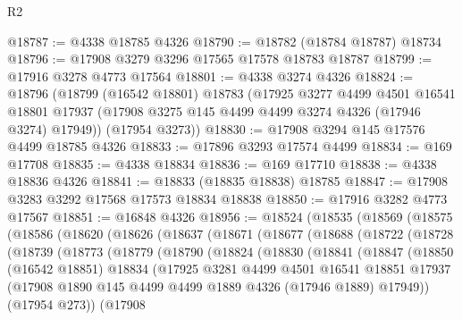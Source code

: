 \begin{lexlean}{R2}
\begin{coremodule}
@18787 := @4338 @18785 @4326
@18790 := @18782 (@18784 @18787) @18734
@18796 := @17908 @3279 @3296 @17565 @17578 @18783 @18787
@18799 := @17916 @3278 @4773 @17564
@18801 := @4338 @3274 @4326
@18824 := @18796
    (@18799
      (@16542 @18801)
      @18783
      (@17925
        @3277
        @4499
        @4501
        @16541
        @18801
        @17937
        (@17908 @3275 @145 @4499 @4499 @3274 @4326 (@17946 @3274) @17949))
      (@17954 @3273))
@18830 := @17908 @3294 @145 @17576 @4499 @18785 @4326
@18833 := @17896 @3293 @17574 @4499
@18834 := @169 @17708
@18835 := @4338 @18834
@18836 := @169 @17710
@18838 := @4338 @18836 @4326
@18841 := @18833 (@18835 @18838) @18785
@18847 := @17908 @3283 @3292 @17568 @17573 @18834 @18838
@18850 := @17916 @3282 @4773 @17567
@18851 := @16848 @4326
@18956 := @18524
    (@18535
      (@18569
        (@18575
          (@18586
            (@18620
              (@18626
                (@18637
                  (@18671
                    (@18677
                      (@18688
                        (@18722
                          (@18728
                            (@18739
                              (@18773
                                (@18779
                                  (@18790
                                    (@18824
                                      (@18830
                                        (@18841
                                          (@18847
                                            (@18850
                                              (@16542 @18851)
                                              @18834
                                              (@17925
                                                @3281
                                                @4499
                                                @4501
                                                @16541
                                                @18851
                                                @17937
                                                (@17908
                                                  @1890
                                                  @145
                                                  @4499
                                                  @4499
                                                  @1889
                                                  @4326
                                                  (@17946 @1889)
                                                  @17949))
                                              (@17954 @273))
                                            (@17908

\end{coremodule}
\end{lexlean}
